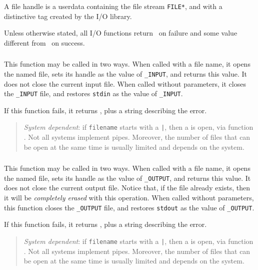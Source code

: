 A file handle is a userdata containing the file stream \verb|FILE*|,
and with a distinctive tag created by the I/O library.


Unless otherwise stated,
all I/O functions return \nil\ on failure and
some value different from \nil\ on success.

\subsubsection*{\ff {}}

This function may be called in two ways.
When called with a file name, it opens the named file,
sets its handle as the value of \verb|_INPUT|,
and returns this value.
It does not close the current input file.
When called without parameters,
it closes the \verb|_INPUT| file,
and restores \verb|stdin| as the value of \verb|_INPUT|.

If this function fails, it returns \nil,
plus a string describing the error.

\begin{quotation}
\noindent
\emph{System dependent}: if \verb|filename| starts with a \verb-|-,
then a  is open, via function .
Not all systems implement pipes.
Moreover,
the number of files that can be open at the same time is
usually limited and depends on the system.
\end{quotation}

\subsubsection*{\ff {}}

This function may be called in two ways.
When called with a file name,
it opens the named file,
sets its handle as the value of \verb|_OUTPUT|,
and returns this value.
It does not close the current output file.
Notice that, if the file already exists,
then it will be \emph{completely erased} with this operation.
When called without parameters,
this function closes the \verb|_OUTPUT| file,
and restores \verb|stdout| as the value of \verb|_OUTPUT|.

If this function fails, it returns \nil,
plus a string describing the error.

\begin{quotation}
\noindent
\emph{System dependent}: if \verb|filename| starts with a \verb-|-,
then a  is open, via function .
Not all systems implement pipes.
Moreover,
the number of files that can be open at the same time is
usually limited and depends on the system.
\end{quotation}

